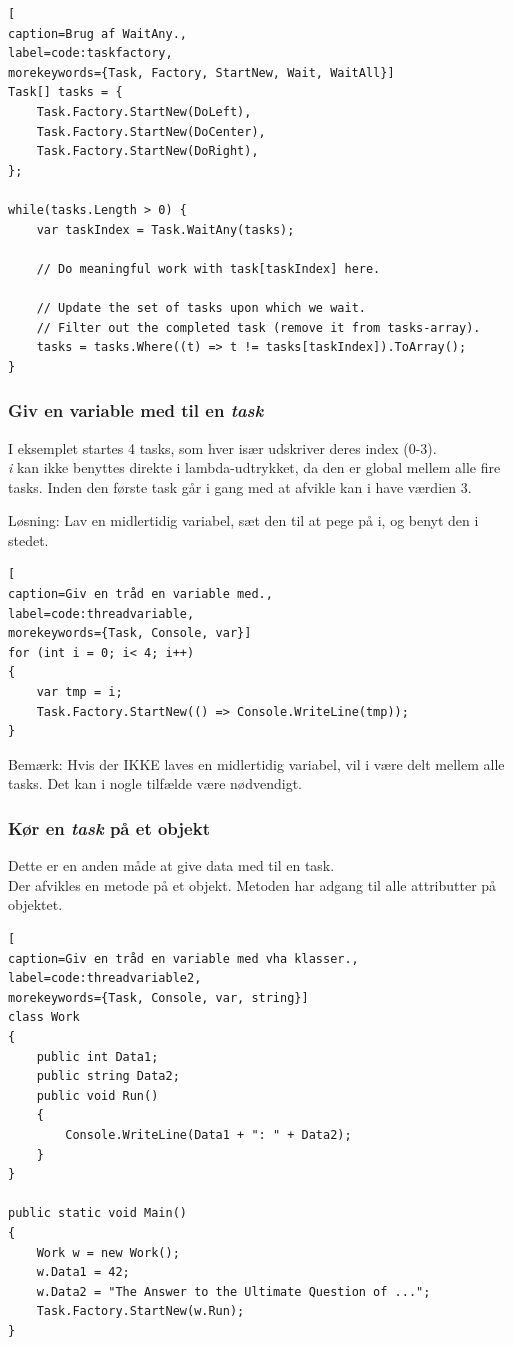 \begin{lstlisting}[
caption=Brug af WaitAny.,
label=code:taskfactory,
morekeywords={Task, Factory, StartNew, Wait, WaitAll}]
Task[] tasks = {
	Task.Factory.StartNew(DoLeft),
	Task.Factory.StartNew(DoCenter),
	Task.Factory.StartNew(DoRight),
};

while(tasks.Length > 0) {
	var taskIndex = Task.WaitAny(tasks);
	
	// Do meaningful work with task[taskIndex] here.
	
	// Update the set of tasks upon which we wait.
	// Filter out the completed task (remove it from tasks-array).
	tasks = tasks.Where((t) => t != tasks[taskIndex]).ToArray();
}
\end{lstlisting}

\subsubsection{Giv en variable med til en \textit{task}}
I eksemplet startes 4 tasks, som hver især udskriver deres index (0-3).\\

\textit{i} kan ikke benyttes direkte i lambda-udtrykket, da den er global mellem alle fire tasks. Inden den første task går i gang med at afvikle kan i have værdien 3.

Løsning: Lav en midlertidig variabel, sæt den til at pege på i, og benyt den i stedet.

\begin{lstlisting}[
caption=Giv en tråd en variable med.,
label=code:threadvariable,
morekeywords={Task, Console, var}]
for (int i = 0; i< 4; i++)
{
	var tmp = i;
	Task.Factory.StartNew(() => Console.WriteLine(tmp));
}
\end{lstlisting}

Bemærk: Hvis der IKKE laves en midlertidig variabel, vil i være delt mellem alle tasks. Det kan i nogle tilfælde være nødvendigt.

\subsubsection{Kør en \textit{task} på et objekt}
Dette er en anden måde at give data med til en task.\\

Der afvikles en metode på et objekt. Metoden har adgang til alle attributter på objektet.

\begin{lstlisting}[
caption=Giv en tråd en variable med vha klasser.,
label=code:threadvariable2,
morekeywords={Task, Console, var, string}]
class Work
{
	public int Data1;
	public string Data2;
	public void Run()
	{
		Console.WriteLine(Data1 + ": " + Data2);
	}
}

public static void Main()
{
	Work w = new Work();
	w.Data1 = 42;
	w.Data2 = "The Answer to the Ultimate Question of ...";
	Task.Factory.StartNew(w.Run);
}
\end{lstlisting}